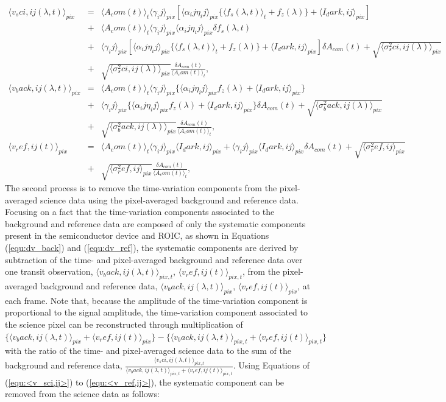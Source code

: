 \documentclass{aastex62}
\def\hoge<#1>{\langle #1 \rangle}
\begin{document}
\begin{eqnarray}
\label{equ:<v_sci,ij>}
\hoge<v_{sci,ij}(\lambda,t)>_{pix} &=& \hoge<A_{com}(t)>_{t}\hoge<\gamma_{ij}>_{pix}[\hoge<\alpha_{ij}\eta_{ij}>_{pix}\{\hoge<f_{s}(\lambda,t)>_{t}+f_{z}(\lambda)\}+\hoge<I_{dark,ij}>_{pix}] \nonumber \\
&+& \hoge<A_{com}(t)>_{t}\hoge<\gamma_{ij}>_{pix}\hoge<\alpha_{ij}\eta_{ij}>_{pix}{\delta}f_{s}(\lambda,t) \nonumber \\
&+& \hoge<\gamma_{ij}>_{pix}[\hoge<\alpha_{ij}\eta_{ij}>_{pix}\{\hoge<f_{s}(\lambda,t)>_{t}+f_{z}(\lambda)\}+\hoge<I_{dark,ij}>_{pix}]{\delta}A_{com}(t)+\sqrt{\hoge<\sigma^{2}_{sci,ij}(\lambda)>_{pix}} \nonumber \\
&+& \sqrt{\hoge<\sigma^{2}_{sci,ij}(\lambda)>_{pix}}\frac{{\delta}A_{com}(t)}{\hoge<A_{com}(t)>_{t}} , \\
\hoge<v_{back,ij}(\lambda,t)>_{pix} &=& \hoge<A_{com}(t)>_{t}\hoge<\gamma_{ij}>_{pix}\{\hoge<\alpha_{ij}\eta_{ij}>_{pix}f_{z}(\lambda)+\hoge<I_{dark,ij}>_{pix}\} \nonumber \\
&+& \hoge<\gamma_{ij}>_{pix}\{\hoge<\alpha_{ij}\eta_{ij}>_{pix}f_{z}(\lambda)+\hoge<I_{dark,ij}>_{pix}\}{\delta}A_{com}(t)+\sqrt{\hoge<\sigma^{2}_{back,ij}(\lambda)>_{pix}} \nonumber \\
&+& \sqrt{\hoge<\sigma^{2}_{back,ij}(\lambda)>_{pix}}\frac{{\delta}A_{com}(t)}{\hoge<A_{com}(t)>_{t}} , \\
\label{equ:<v_ref,ij>}
\hoge<v_{ref,ij}(t)>_{pix} &=& \hoge<A_{com}(t)>_{t}\hoge<\gamma_{ij}>_{pix}\hoge<I_{dark,ij}>_{pix}+\hoge<\gamma_{ij}>_{pix}\hoge<I_{dark,ij}>_{pix}{\delta}A_{com}(t)+\sqrt{\hoge<\sigma^{2}_{ref,ij}>_{pix}} \nonumber \\
&+& \sqrt{\hoge<\sigma^{2}_{ref,ij}>_{pix}}\frac{{\delta}A_{com}(t)}{\hoge<A_{com}(t)>_{t}} ,
\end{eqnarray}
The second process is to remove the time-variation components from the pixel-averaged science data using the pixel-averaged background and reference data. Focusing on a fact that the time-variation components associated to the background and reference data are composed of only the systematic components present in the semiconductor device and ROIC, as shown in Equations (\ref{equ:dv_back}) and (\ref{equ:dv_ref}), the systematic components are derived by subtraction of the time- and pixel-averaged background and reference data over one transit observation, $\hoge<v_{back,ij}(\lambda,t)>_{pix,t}$, $\hoge<v_{ref,ij}(t)>_{pix,t}$, from the pixel-averaged background and reference data, $\hoge<v_{back,ij}(\lambda,t)>_{pix}$, $\hoge<v_{ref,ij}(t)>_{pix}$, at each frame. Note that, because the amplitude of the time-variation component is proportional to the signal amplitude, the time-variation component associated to the science pixel can be reconstructed through multiplication of $\{\hoge<v_{back,ij}(\lambda,t)>_{pix}+\hoge<v_{ref,ij}(t)>_{pix}\}-\{\hoge<v_{back,ij}(\lambda,t)>_{pix,t}+\hoge<v_{ref,ij}(t)>_{pix,t}\}$ with the ratio of the time- and pixel-averaged science data to the sum of the background and reference data, $\frac{\hoge<v_{sci,ij}(\lambda,t)>_{pix,t}}{\hoge<v_{back,ij}(\lambda,t)>_{pix,t}+\hoge<v_{ref,ij}(t)>_{pix,t}}$. Using Equations of (\ref{equ:<v_sci,ij>}) to (\ref{equ:<v_ref,ij>}), the systematic component can be removed from the science data as follows:
\end{document}
